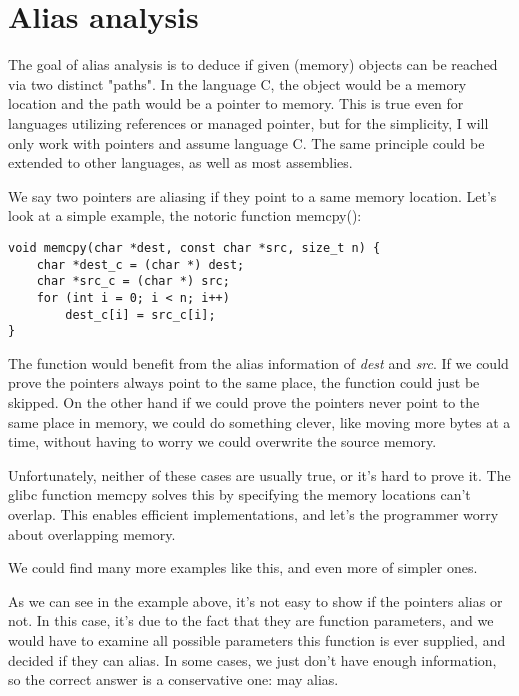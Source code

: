 \newcommand{\definice}{\paragraph{Definice.}}
\newcommand{\todo}[1]{{\bf\large TODO: #1}}

\section{Alias analysis}

The goal of alias analysis is to deduce if given (memory) objects can be reached
via two distinct "paths". In the language C, the object would be a memory
location and the path would be a pointer to memory. This is true even for
languages utilizing references or managed pointer, but for the simplicity, I
will only work with pointers and assume language C. The same principle could be
extended to other languages, as well as most assemblies.

We say two pointers are aliasing if they point to a same memory location. Let's
look at a simple example, the notoric function memcpy():

\begin{verbatim}
void memcpy(char *dest, const char *src, size_t n) {
    char *dest_c = (char *) dest;
    char *src_c = (char *) src;
    for (int i = 0; i < n; i++)
        dest_c[i] = src_c[i];
}
\end{verbatim}

The function would benefit from the alias information of {\it dest} and {\it
src}. If we could prove the pointers always point to the same place, the
function could just be skipped. On the other hand if we could prove the pointers
never point to the same place in memory, we could do something clever, like
moving more bytes at a time, without having to worry we could overwrite the
source memory.

Unfortunately, neither of these cases are usually true, or it's hard to prove
it. The glibc function memcpy solves this by specifying the memory locations
can't overlap. This enables efficient implementations, and let's the programmer
worry about overlapping memory.

We could find many more examples like this, and even more of simpler ones.

As we can see in the example above, it's not easy to show if the pointers alias
or not. In this case, it's due to the fact that they are function parameters,
and we would have to examine all possible parameters this function is ever
supplied, and decided if they can alias. In some cases, we just don't have
enough information, so the correct answer is a conservative one: may alias.

